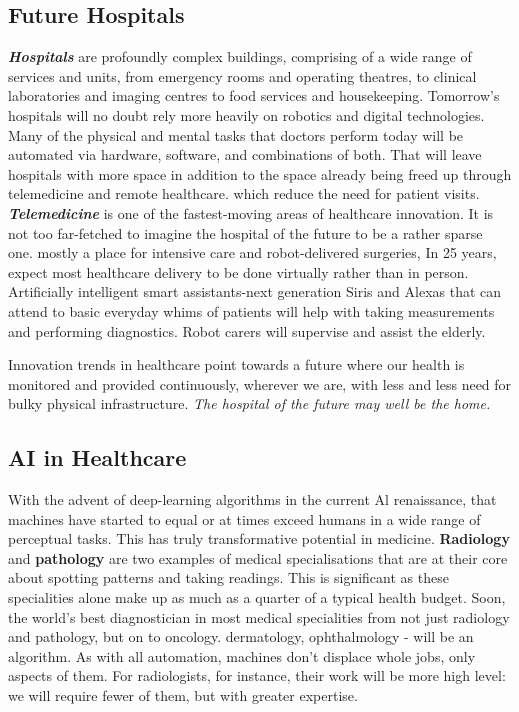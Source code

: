 \documentclass[12pt]{article}
\begin{document}
\subsection{Future Hospitals}
\textbf{\emph{Hospitals}} are profoundly complex buildings, comprising of a wide range of services and units, from emergency rooms and operating theatres, to clinical laboratories and imaging centres to food services and housekeeping. \newline
Tomorrow's hospitals will no doubt rely more heavily on robotics and digital technologies. Many of the physical and mental tasks that doctors perform today will be automated via hardware, software, and combinations of both. That will leave hospitals with more space in addition to the space already being freed up through telemedicine and remote healthcare. which reduce the need for patient visits.\newline
\textbf{\emph{Telemedicine}} is one of the fastest-moving areas of healthcare innovation. It is not too far-fetched to imagine the hospital of the future to be a rather sparse one. mostly a place for intensive care and robot-delivered surgeries, In 25 years, expect most healthcare delivery to be done virtually rather than in person.
 Artificially intelligent smart assistants-next generation Siris and Alexas that can attend to basic everyday whims of patients will help with taking measurements and performing diagnostics. Robot carers will supervise and assist the elderly.\newline

Innovation trends in healthcare point towards a future where our health is monitored and provided continuously, wherever we are, with less and less need for bulky physical infrastructure. \emph{The hospital of the future may well be the home.}
\subsection{AI in Healthcare}
With the advent of deep-learning algorithms in the current Al renaissance, that machines have started to equal or at times exceed humans in a wide range of perceptual tasks. This has truly transformative potential in medicine.\newline
\textbf{Radiology} and \textbf{pathology} are two examples of medical specialisations that are at their core about spotting patterns and taking readings. This is significant as these specialities alone make up as much as a quarter of a typical health budget. Soon, the world's best diagnostician in most medical specialities from not just radiology and pathology, but on to oncology. dermatology, ophthalmology - will be an algorithm.\newline
 As with all automation, machines don't displace whole jobs, only aspects of them. For radiologists, for instance, their work will be more high level: we will require fewer of them, but with greater expertise.\nelwine
\end{document}
